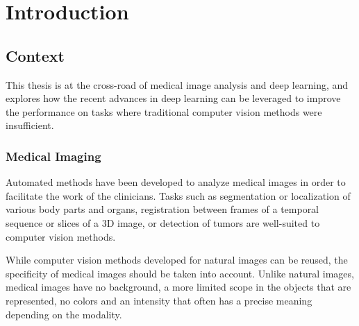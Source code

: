\chapter{Introduction}
\label{chap:intro}





\section{Context}

This thesis is at the cross-road of medical image analysis and deep learning, and explores how the recent advances in deep learning can be leveraged to improve the performance on tasks where traditional computer vision methods were insufficient. 

\subsection{Medical Imaging}


Automated methods have been developed to analyze medical images in order to facilitate the work of the clinicians. Tasks such as segmentation or localization of various body parts and organs, registration between frames of a temporal sequence or slices of a 3D image, or detection of tumors are well-suited to computer vision methods.

While computer vision methods developed for natural images can be reused, the specificity of medical images should be taken into account. Unlike natural images, medical images have no background, a more limited scope in the objects that are represented, no colors and an intensity that often has a precise meaning depending on the modality.

